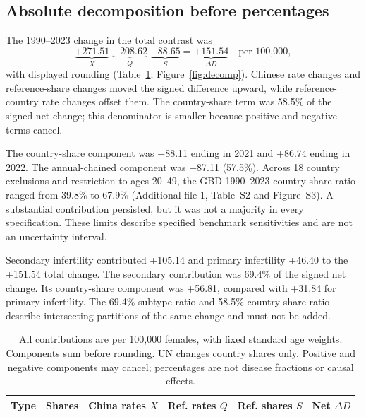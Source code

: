 \documentclass[11pt,a4paper]{article}
\begin{document}
\subsection{Absolute decomposition before percentages}
The 1990--2023 change in the total contrast was
\begin{equation}
 \underbrace{+271.51}_{X}\;\underbrace{-208.62}_{Q}\;\underbrace{+88.65}_{S}
 =\underbrace{+151.54}_{\Delta D}\quad\text{per 100,000},
\end{equation}
with displayed rounding (Table~\ref{tab:decomp}; Figure~\ref{fig:decomp}). Chinese rate changes and reference-share changes moved the signed difference upward, while reference-country rate changes offset them. The country-share term was 58.5\% of the signed net change; this denominator is smaller because positive and negative terms cancel.

The country-share component was +88.11 ending in 2021 and +86.74 ending in 2022. The annual-chained component was +87.11 (57.5\%). Across 18 country exclusions and restriction to ages 20--49, the GBD 1990--2023 country-share ratio ranged from 39.8\% to 67.9\% (Additional file 1, Table~S2 and Figure~S3). A substantial contribution persisted, but it was not a majority in every specification. These limits describe specified benchmark sensitivities and are not an uncertainty interval.

Secondary infertility contributed +105.14 and primary infertility +46.40 to the +151.54 total change. The secondary contribution was 69.4\% of the signed net change. Its country-share component was +56.81, compared with +31.84 for primary infertility. The 69.4\% subtype ratio and 58.5\% country-share ratio describe intersecting partitions of the same change and must not be added.

\begin{table}[htbp]\centering\small{}
\caption{Symmetric PCOS contrast-change decomposition, 1990--2023, by population source.}\label{tab:decomp}
\setlength{\tabcolsep}{4pt}
\begin{tabular}{llrrrr}\toprule
Type & Shares & China rates $X$ & Ref. rates $Q$ & Ref. shares $S$ & Net $\Delta D$\\\midrule
\end{tabular}
\caption*{All contributions are per 100,000 females, with fixed standard age weights. Components sum before rounding. UN changes country shares only. Positive and negative components may cancel; percentages are not disease fractions or causal effects.}
\end{table}
\end{document}
